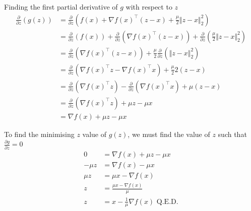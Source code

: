 \documentclass{exam}
\begin{document}
\begin{questions}
\begin{parts}
{            Finding the first partial derivative of $g$ with respect to $z$
            \begin{align*}
                \frac{\partial}{\partial z} \left(g(z)\right) & = \frac{\partial}{\partial z} \left(f(x) + \nabla f(x) ^\top (z - x) + \frac{\mu}{2}\Vert z - x \Vert^2_2\right)                                                                                 \\
                                                              & = \frac{\partial}{\partial z} \left(f(x)\right) + \frac{\partial}{\partial z}\left(\nabla f(x) ^\top (z - x)\right) + \frac{\partial}{\partial z}\left(\frac{\mu}{2}\Vert z - x \Vert^2_2\right) \\
                                                              & = \frac{\partial}{\partial z}\left(\nabla f(x) ^\top (z - x)\right) + \frac{\mu}{2}\frac{\partial}{\partial z}\left(\Vert z - x \Vert^2_2\right)                                                 \\
                                                              & = \frac{\partial}{\partial z}\left(\nabla f(x) ^\top z - \nabla f(x) ^\top x\right) + \frac{\mu}{2}2\left(z - x\right)                                                                           \\
                                                              & = \frac{\partial}{\partial z}\left(\nabla f(x) ^\top z \right) - \frac{\partial}{\partial z}\left(\nabla f(x) ^\top x\right) + \mu\left(z - x\right)                                             \\
                                                              & = \frac{\partial}{\partial z}\left(\nabla f(x) ^\top z \right)  + \mu z - \mu x                                                                                                                  \\
                                                              & = \nabla f(x)  + \mu z - \mu x
            \end{align*}

            To find the minimising $z$ value of $g(z)$, we must find the value of $z$ such that $\frac{\partial g}{\partial z} = 0$
            \begin{align*}
                0      & = \nabla f(x)  + \mu z - \mu x                \\
                -\mu z & = \nabla f(x)  - \mu x                        \\
                \mu z  & =  \mu x -\nabla f(x)                         \\
                z      & =  \frac{\mu x -\nabla f(x)}{\mu}             \\
                z      & =  x -\frac{1}{\mu}\nabla f(x) \text{ Q.E.D.}
            \end{align*}
        }


\end{parts}
\end{questions}
\end{document}
